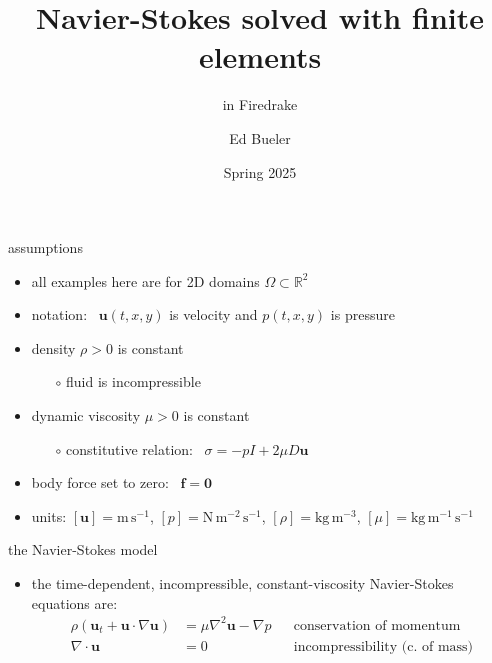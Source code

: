 \documentclass[10pt,hyperref,colorlinks]{beamer}
\title{Navier-Stokes solved with finite elements}
\subtitle{in Firedrake}
\author{Ed Bueler}
\institute{MATH 692 Fluids \& Solids Seminar}
\date{Spring 2025}
\newcommand{\bbf}{\mathbf{f}}
\newcommand{\bu}{\mathbf{u}}
\newcommand{\bzero}{\bm{0}}
\newcommand{\grad}{\nabla}
\newcommand{\Div}{\nabla\cdot}
\newcommand{\RR}{\mathbb{R}}
\begin{document}
\beamertemplatenavigationsymbolsempty

\begin{frame}
  \maketitle
\end{frame}


\begin{frame}{assumptions}

\begin{itemize}
\item all examples here are for 2D domains $\Omega \subset \RR^2$
\item notation: \, $\bu(t,x,y)$ is velocity and $p(t,x,y)$ is pressure
\item density $\rho>0$ is constant
    \begin{itemize}
    \item[$\circ$] fluid is incompressible
    \end{itemize}
\item dynamic viscosity $\mu>0$ is constant
    \begin{itemize}
    \item[$\circ$] constitutive relation: \, $\sigma = -p I + 2 \mu D\bu$
    \end{itemize}
\item body force set to zero: \, $\bbf = \bzero$

\bigskip
\item units: $[\bu]=\text{m}\,\text{s}^{-1}$, $[p]=\text{N}\,\text{m}^{-2}\,\text{s}^{-1}$, $[\rho]=\text{kg}\,\text{m}^{-3}$, $[\mu]=\text{kg}\,\text{m}^{-1}\,\text{s}^{-1}$
\end{itemize}
\end{frame}


\begin{frame}{the Navier-Stokes model}

\begin{itemize}
\item the time-dependent, incompressible, constant-viscosity Navier-Stokes equations are:
\begin{align*}
\rho\left(\bu_t + \bu \cdot \grad \bu\right) &= \mu \grad^2 \bu - \grad p & &\text{conservation of momentum} \\
\Div \bu &= 0 & &\text{incompressibility (c.~of mass)}
\end{align*}
\end{itemize}
\end{frame}
\end{document}
